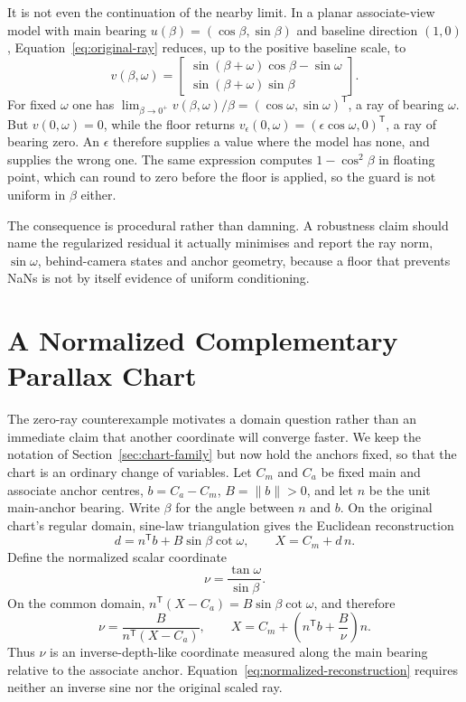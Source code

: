\documentclass[11pt,a4paper]{article}
\theoremstyle{definition}
\theoremstyle{remark}
\newcommand{\T}{\mathsf{T}}
\begin{document}
It is not even the continuation of the nearby limit. In a planar associate-view model with main bearing $u(\beta)=(\cos\beta,\sin\beta)$ and baseline direction $(1,0)$, Equation~\eqref{eq:original-ray} reduces, up to the positive baseline scale, to
\begin{equation}
  v(\beta,\omega)=
  \begin{bmatrix}
  \sin(\beta+\omega)\cos\beta-\sin\omega\\
  \sin(\beta+\omega)\sin\beta
  \end{bmatrix}.
  \label{eq:reduced-ray}
\end{equation}
For fixed $\omega$ one has $\lim_{\beta\to0^+}v(\beta,\omega)/\beta=(\cos\omega,\sin\omega)^\T$, a ray of bearing $\omega$. But $v(0,\omega)=0$, while the floor returns $v_\epsilon(0,\omega)=(\epsilon\cos\omega,0)^\T$, a ray of bearing zero. An $\epsilon$ therefore supplies a value where the model has none, and supplies the wrong one. The same expression computes $1-\cos^2\beta$ in floating point, which can round to zero before the floor is applied, so the guard is not uniform in $\beta$ either.

The consequence is procedural rather than damning. A robustness claim should name the regularized residual it actually minimises and report the ray norm, $\sin\omega$, behind-camera states and anchor geometry, because a floor that prevents NaNs is not by itself evidence of uniform conditioning.

\section{A Normalized Complementary Parallax Chart}
\label{sec:normalized-chart}
The zero-ray counterexample motivates a domain question rather than an immediate claim that another coordinate will converge faster. We keep the notation of Section~\ref{sec:chart-family} but now hold the anchors fixed, so that the chart is an ordinary change of variables. Let $C_m$ and $C_a$ be fixed main and associate anchor centres, $b=C_a-C_m$, $B=\|b\|>0$, and let $n$ be the unit main-anchor bearing. Write $\beta$ for the angle between $n$ and $b$. On the original chart's regular domain, sine-law triangulation gives the Euclidean reconstruction
\begin{equation}
  d=n^\T b+B\sin\beta\cot\omega,
  \qquad X=C_m+d\,n .
  \label{eq:raw-depth}
\end{equation}
Define the normalized scalar coordinate
\begin{equation}
  \boxed{\nu=\frac{\tan\omega}{\sin\beta}} .
  \label{eq:normalized-coordinate}
\end{equation}
On the common domain, $n^\T(X-C_a)=B\sin\beta\cot\omega$, and therefore
\begin{equation}
  \nu=\frac{B}{n^\T(X-C_a)},
  \qquad
  \boxed{X=C_m+\left(n^\T b+\frac{B}{\nu}\right)n} .
  \label{eq:normalized-reconstruction}
\end{equation}
Thus $\nu$ is an inverse-depth-like coordinate measured along the main bearing relative to the associate anchor. Equation~\eqref{eq:normalized-reconstruction} requires neither an inverse sine nor the original scaled ray.
\end{document}
